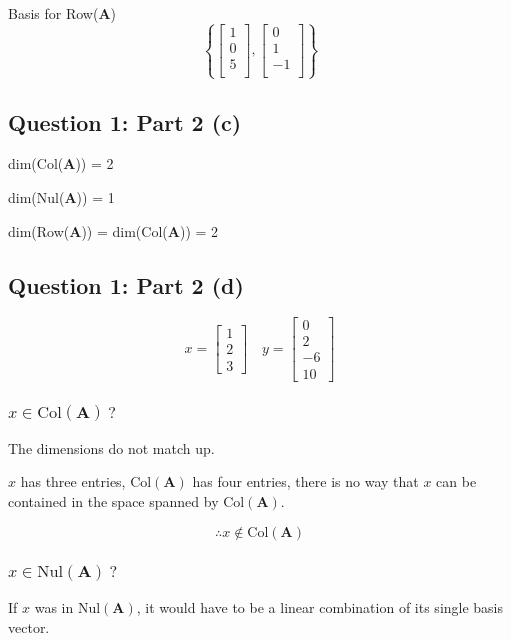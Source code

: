 \documentclass{article}
\begin{document}
Basis for Row($ \mathbf{A} $)
\[%
    \left\{ 
    \begin{bmatrix} 1\\0\\ 5\\ \end{bmatrix},
    \begin{bmatrix} 0\\1\\-1\\ \end{bmatrix}
    \right\}
\]%




\subsection{Question 1: Part 2 (c)} 
dim(Col($ \mathbf{A} $)) = 2

dim(Nul($ \mathbf{A} $)) = 1

dim(Row($ \mathbf{A} $)) = dim(Col($ \mathbf{A} $)) = 2

\subsection{Question 1: Part 2 (d)} 


\[%
    x
    =
    \begin{bmatrix} 1\\2\\3 \end{bmatrix}
    \quad
    y
    =
    \begin{bmatrix} 0\\2\\-6\\10 \end{bmatrix}
\]%


\subsubsection{$ x \in \text{Col}(\mathbf{A}) \ ?$}
The dimensions do not match up.

$x$ has three entries, $\text{Col}(\mathbf{A})$ has four entries, there is no
way that $x$ can be contained in the space spanned by $\text{Col}(\mathbf{A})$.


\[%
    \therefore x \notin \text{Col}(\mathbf{A})
\]%


\subsubsection{$ x \in \text{Nul}(\mathbf{A}) \ ?$}
If $x$ was in $\text{Nul}(\mathbf{A})$, it would have to be a linear combination
of its single basis vector.
\end{document}
